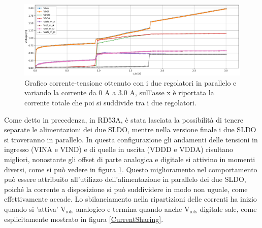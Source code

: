\begin{figure}[h]
\centering
\includegraphics[width=\textwidth]{Immagini/PUI}
\caption{Grafico corrente-tensione ottenuto con i due regolatori in parallelo e variando la corrente da 0 A a 3.0 A, sull'asse x è riportata la corrente totale che poi si suddivide tra i due regolatori.}
\label{PUI}
\end{figure}
Come detto in precedenza, in RD53A, è stata lasciata la possibilità di tenere separate le alimentazioni dei due SLDO, mentre nella versione finale i due SLDO si troveranno in parallelo. 
In questa configurazione gli andamenti delle tensioni in ingresso (VINA e VIND) e di quelle in uscita (VDDD e VDDA) risultano migliori, nonostante gli offset di parte analogica e digitale si attivino in momenti diversi, come si può vedere in figura \ref{PUI}.
Questo miglioramento nel comportamento può essere attribuito all'utilizzo dell'alimentazione in parallelo dei due SLDO, poiché la corrente a disposizione si può suddividere in modo non uguale, come effettivamente accade. 
Lo sbilanciamento nella ripartizioni delle correnti ha inizio quando si 'attiva' $\mathrm{V_{iofs}}$ analogico e termina quando anche $\mathrm{V_{iofs}}$  digitale sale, come esplicitamente mostrato in figura \ref{CurrentSharing}.
% 
%


